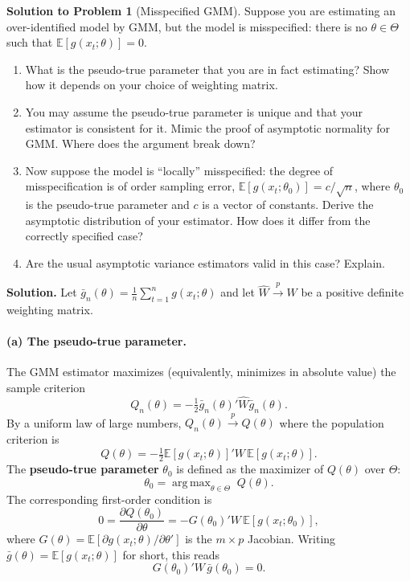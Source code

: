 \documentclass[12pt]{article}
\newcommand{\E}{\mathbb E}
\DeclareMathOperator*{\argmax}{arg\,max}
\theoremstyle{definition}
\newtheorem{solution}{Solution to Problem}
\begin{document}
\newpage
\begin{solution}[Misspecified GMM] Suppose you are estimating an over-identified model by GMM, but the model is misspecified: there is no $\theta\in\Theta$ such that $\E[g(x_t;\theta)]=0$. 
\begin{enumerate}
    \item What is the pseudo-true parameter that you are in fact estimating? Show how it depends on your choice of weighting matrix.
    \item You may assume the pseudo-true parameter is unique and that your estimator is consistent for it. Mimic the proof of asymptotic normality for GMM. Where does the argument break down?
    \item Now suppose the model is ``locally'' misspecified: the degree of misspecification is of order sampling error, $\E[g(x_t;\theta_0)]=c/\sqrt{n}$, where $\theta_0$ is the pseudo-true parameter and $c$ is a vector of constants. Derive the asymptotic distribution of your estimator. How does it differ from the correctly specified case?
    \item Are the usual asymptotic variance estimators valid in this case? Explain.
\end{enumerate}

\medskip
\noindent\textbf{Solution.} Let $\bar{g}_n(\theta)=\frac{1}{n}\sum_{t=1}^n g(x_t;\theta)$ and let $\hat{W}\xrightarrow{p}W$ be a positive definite weighting matrix.

\bigskip
\paragraph{(a) The pseudo-true parameter.} The GMM estimator maximizes (equivalently, minimizes in absolute value) the sample criterion
\[
Q_n(\theta) = -\tfrac{1}{2}\bar{g}_n(\theta)'\hat{W}\bar{g}_n(\theta).
\]
By a uniform law of large numbers, $Q_n(\theta)\xrightarrow{p}Q(\theta)$ where the population criterion is
\[
Q(\theta) = -\tfrac{1}{2}\E[g(x_t;\theta)]'W\,\E[g(x_t;\theta)].
\]
The \textbf{pseudo-true parameter} $\theta_0$ is defined as the maximizer of $Q(\theta)$ over $\Theta$:
\[
\theta_0 = \argmax_{\theta\in\Theta}\; Q(\theta).
\]
The corresponding first-order condition is
\[
0 = \frac{\partial Q(\theta_0)}{\partial\theta} = -G(\theta_0)'W\,\E[g(x_t;\theta_0)],
\]
where $G(\theta)=\E[\partial g(x_t;\theta)/\partial\theta']$ is the $m\times p$ Jacobian. Writing $\bar{g}(\theta)=\E[g(x_t;\theta)]$ for short, this reads
\[
\boxed{G(\theta_0)'W\,\bar{g}(\theta_0) = 0.}
\]


\end{solution}
\end{document}
